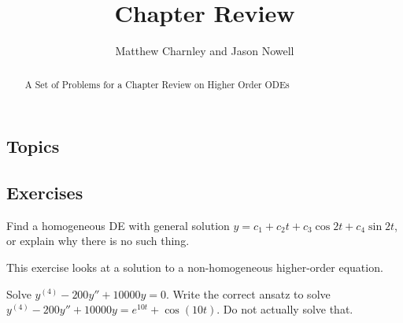 \documentclass{ximera}
\title{Chapter Review}
\author{Matthew Charnley and Jason Nowell}
\begin{document}
\begin{abstract}
    A Set of Problems for a Chapter Review on Higher Order ODEs
\end{abstract}
\maketitle

\subsection{Topics}

\subsection{Exercises}

\begin{exercise}
    Find a homogeneous DE with general solution $y=c_1+c_2t+c_3\cos 2t+ c_4\sin 2t$, or explain why there is no such thing.
\end{exercise}

\begin{exercise}
    This exercise looks at a solution to a non-homogeneous higher-order equation.
    \begin{tasks}
        \task Solve $y^{(4)}-200y''+10000y=0$.
        \task Write the correct ansatz to solve $y^{(4)}-200y''+10000y=e^{10t}+ \cos(10t)$. Do not actually solve that.
    \end{tasks}
\end{exercise}
\end{document}

